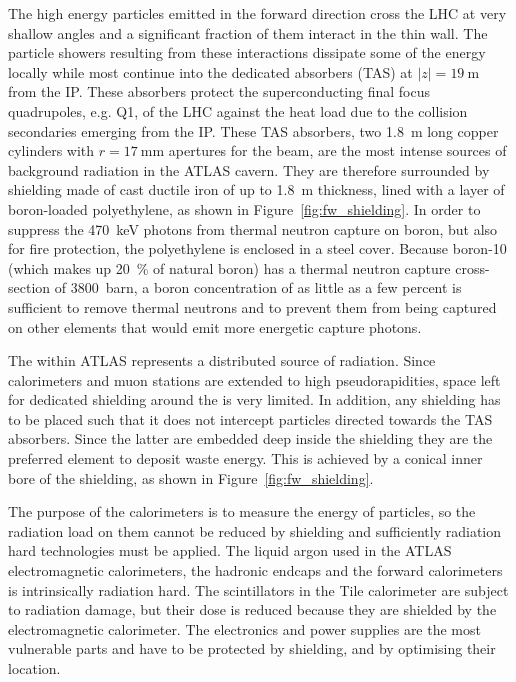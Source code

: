 \documentclass[cernpreprint, atlasdraft=false, UKenglish,british,orcidlogo, texmf, orcidlogo]{atlasdoc}
\begin{document}
The high energy particles emitted in the forward direction cross the \gls{LHC} \beampipe at very shallow
angles and a significant fraction of them interact in the thin \beampipe wall. The particle showers
resulting from these interactions dissipate some of the energy locally while most continue into
the dedicated absorbers (\gls{TAS}) at $|z|=\SI{19}{\m}$ from the \gls{IP}. These absorbers protect the superconducting final focus
quadrupoles, e.g. Q1, of the \gls{LHC} against the heat load due to the collision secondaries emerging from the \gls{IP}.
These \gls{TAS} absorbers, two \SI{1.8}{\m} long copper cylinders with $r=\SI{17}{\mm}$ apertures for the beam, are
the most intense sources of background radiation in the ATLAS cavern.
They are therefore surrounded by shielding made of cast ductile iron of up to \SI{1.8}{\m} thickness, lined
with a layer of boron-loaded polyethylene, as shown in
Figure~\ref{fig:fw_shielding}.
In order to suppress the \SI{470}{\keV} photons from thermal neutron capture on boron, but also for fire protection, the polyethylene is
enclosed in a steel cover. Because boron-10 (which makes up \SI{20}{\percent} of natural boron) has a thermal neutron capture cross-section
of \SI{3800}{barn}, a boron concentration of as little as a few percent is sufficient to remove thermal neutrons and to prevent them from being captured on other elements that would emit more energetic capture photons.
 
The \beampipe within ATLAS represents a distributed source of radiation. Since calorimeters and
muon stations are extended to high pseudorapidities, space left for dedicated shielding around the
\beampipe is very limited. In addition, any shielding has to be placed such that it does not intercept particles
directed towards the \gls{TAS} absorbers. Since the latter are embedded deep inside the shielding they are the preferred
element to deposit waste energy. This is achieved by a conical inner bore of the shielding, as shown in
Figure~\ref{fig:fw_shielding}.
 
The purpose of the calorimeters is to measure the energy of particles,
so the radiation load on them cannot be reduced by shielding and sufficiently
radiation hard technologies must be applied. The liquid argon used in the ATLAS electromagnetic calorimeters,
the hadronic endcaps and the forward calorimeters is intrinsically radiation hard. The scintillators in the Tile calorimeter
are subject to radiation damage, but their dose is reduced because they are shielded by the electromagnetic calorimeter.
The electronics and power supplies are the most vulnerable parts and have to be protected
by shielding, and by optimising their location.
 
\end{document}
